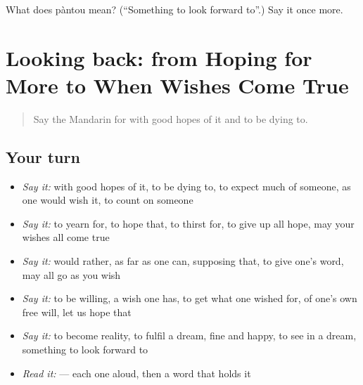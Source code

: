 \begin{tcolorbox}[breakable,colback=teal!4,colframe=teal!35!black,title={Before you move on}]
What does pàntou mean? (\textquotedblleft{}Something to look forward to\textquotedblright{}.) Say it once more.
\end{tcolorbox}
\section[(dialogue)]{Looking back: from Hoping for More to When Wishes Come True}

\label{lesson:ZH-R536-review-532-536}



\begin{quote}
Say the Mandarin for with good hopes of it and to be dying to.
\end{quote}

\subsection*{Your turn}
\begin{itemize}
\raggedright
  \item \emph{Say it:} with good hopes of it, to be dying to, to expect much of someone, as one would wish it, to count on someone
  \item \emph{Say it:} to yearn for, to hope that, to thirst for, to give up all hope, may your wishes all come true
  \item \emph{Say it:} would rather, as far as one can, supposing that, to give one's word, may all go as you wish
  \item \emph{Say it:} to be willing, a wish one has, to get what one wished for, of one's own free will, let us hope that
  \item \emph{Say it:} to become reality, to fulfil a dream, fine and happy, to see in a dream, something to look forward to
  \item \emph{Read it:}    — each one aloud, then a word that holds it
\end{itemize}


